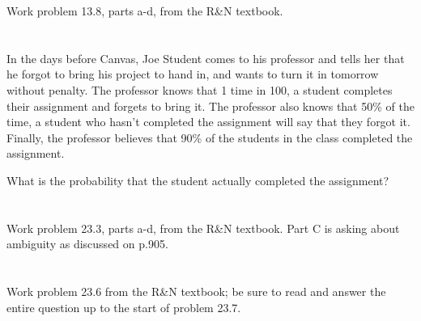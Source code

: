 \documentclass[paper=a4, fontsize=11pt]{scrartcl} %
\begin{document}
\begin{fancyquotes}
  Work problem 13.8, parts a-d, from the R\&N textbook.
\end{fancyquotes}

\pagebreak


\section{}

\begin{fancyquotes}
  In the days before Canvas, Joe Student comes to his professor and
  tells her that he forgot to bring his project to hand in, and wants
  to turn it in tomorrow without penalty. The professor knows that 1
  time in 100, a student completes their assignment and forgets to
  bring it. The professor also knows that 50\% of the time, a student
  who hasn't completed the assignment will say that they forgot
  it. Finally, the professor believes that 90\% of the students in the
  class completed the assignment.

  What is the probability that the student actually completed the
  assignment?
\end{fancyquotes}

\pagebreak


\section{}

\begin{fancyquotes}
  Work problem 23.3, parts a-d, from the R\&N textbook. Part C is
  asking about ambiguity as discussed on p.905.
\end{fancyquotes}

\pagebreak


\section{}

\begin{fancyquotes}
  Work problem 23.6 from the R\&N textbook; be sure to read and answer
  the entire question up to the start of problem 23.7.
\end{fancyquotes}

\pagebreak
\end{document}
